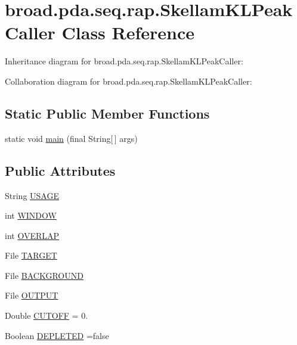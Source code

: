 \hypertarget{classbroad_1_1pda_1_1seq_1_1rap_1_1_skellam_k_l_peak_caller}{\section{broad.\+pda.\+seq.\+rap.\+Skellam\+K\+L\+Peak\+Caller Class Reference}
\label{classbroad_1_1pda_1_1seq_1_1rap_1_1_skellam_k_l_peak_caller}
}


Inheritance diagram for broad.\+pda.\+seq.\+rap.\+Skellam\+K\+L\+Peak\+Caller\+:


Collaboration diagram for broad.\+pda.\+seq.\+rap.\+Skellam\+K\+L\+Peak\+Caller\+:
\subsection*{Static Public Member Functions}
\begin{DoxyCompactItemize}
\item 
static void \hyperlink{classbroad_1_1pda_1_1seq_1_1rap_1_1_skellam_k_l_peak_caller_ae9e70dc2ea97a09395ca2e593ceee908}{main} (final String\mbox{[}$\,$\mbox{]} args)
\end{DoxyCompactItemize}
\subsection*{Public Attributes}
\begin{DoxyCompactItemize}
\item 
String \hyperlink{classbroad_1_1pda_1_1seq_1_1rap_1_1_skellam_k_l_peak_caller_a2f699a4296f23185c2ef1794d8b8621a}{U\+S\+A\+G\+E}
\item 
int \hyperlink{classbroad_1_1pda_1_1seq_1_1rap_1_1_skellam_k_l_peak_caller_a9f35f4842423c43fc1f6b9f5f32b04e3}{W\+I\+N\+D\+O\+W}
\item 
int \hyperlink{classbroad_1_1pda_1_1seq_1_1rap_1_1_skellam_k_l_peak_caller_abe60704a5e13ac08fa42871f05f5f66c}{O\+V\+E\+R\+L\+A\+P}
\item 
File \hyperlink{classbroad_1_1pda_1_1seq_1_1rap_1_1_skellam_k_l_peak_caller_a31fd66af795c3fd6651f95548a262fff}{T\+A\+R\+G\+E\+T}
\item 
File \hyperlink{classbroad_1_1pda_1_1seq_1_1rap_1_1_skellam_k_l_peak_caller_a1a70214b8fe49d6db4365dcbfb3fc99e}{B\+A\+C\+K\+G\+R\+O\+U\+N\+D}
\item 
File \hyperlink{classbroad_1_1pda_1_1seq_1_1rap_1_1_skellam_k_l_peak_caller_a266174a6f56b39c96288752e896cfd56}{O\+U\+T\+P\+U\+T}
\item 
Double \hyperlink{classbroad_1_1pda_1_1seq_1_1rap_1_1_skellam_k_l_peak_caller_ae4c43ea4fba902de8ff4c8c0cc6b0ec0}{C\+U\+T\+O\+F\+F} = 0.
\item 
Boolean \hyperlink{classbroad_1_1pda_1_1seq_1_1rap_1_1_skellam_k_l_peak_caller_ad2ebe279dbc667aafa11b921828c2aee}{D\+E\+P\+L\+E\+T\+E\+D} =false
\end{DoxyCompactItemize}

